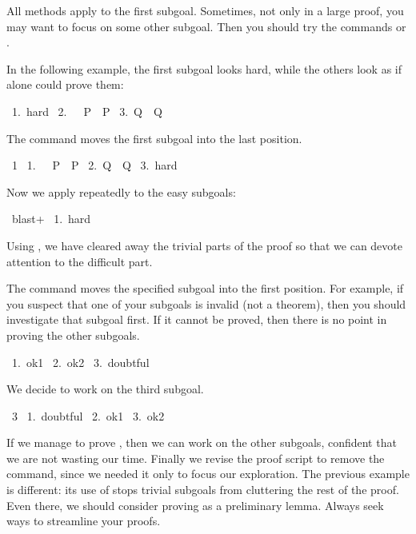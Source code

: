 \medskip
All methods apply to the first subgoal.
Sometimes, not only in a large proof, you may want to focus on some other
subgoal.  Then you should try the commands  or .

In the following example, the first subgoal looks hard, while the others
look as if  alone could prove them:
\begin{isabelle}
\ 1.\ hard\isanewline
\ 2.\ \isasymnot \ \isasymnot \ P\ \isasymLongrightarrow \ P\isanewline
\ 3.\ Q\ \isasymLongrightarrow \ Q%
\end{isabelle}
%
The  command moves the first subgoal into the last position.
\begin{isabelle}
\ 1\isanewline
\ 1.\ \isasymnot \ \isasymnot \ P\ \isasymLongrightarrow \ P\isanewline
\ 2.\ Q\ \isasymLongrightarrow \ Q\isanewline
\ 3.\ hard%
\end{isabelle}
%
Now we apply  repeatedly to the easy subgoals:
\begin{isabelle}
\ blast+\isanewline
\ 1.\ hard%
\end{isabelle}
Using , we have cleared away the trivial parts of the proof so
that we can devote attention to the difficult part.

\medskip
The  command moves the specified subgoal into the
first position.  For example, if you suspect that one of your subgoals is
invalid (not a theorem), then you should investigate that subgoal first.  If it
cannot be proved, then there is no point in proving the other subgoals.
\begin{isabelle}
\ 1.\ ok1\isanewline
\ 2.\ ok2\isanewline
\ 3.\ doubtful%
\end{isabelle}
%
We decide to work on the third subgoal.
\begin{isabelle}
\ 3\isanewline
\ 1.\ doubtful\isanewline
\ 2.\ ok1\isanewline
\ 3.\ ok2
\end{isabelle}
If we manage to prove , then we can work on the other
subgoals, confident that we are not wasting our time.  Finally we revise the
proof script to remove the  command, since we needed it only to
focus our exploration.  The previous example is different: its use of
 stops trivial subgoals from cluttering the rest of the
proof.  Even there, we should consider proving  as a preliminary
lemma.  Always seek ways to streamline your proofs.
 

